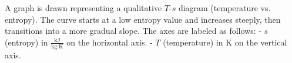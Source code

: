 A graph is drawn representing a qualitative \( T \)-\( s \) diagram (temperature vs. entropy). The curve starts at a low entropy value and increases steeply, then transitions into a more gradual slope. The axes are labeled as follows:  
- \( s \) (entropy) in \( \frac{\text{kJ}}{\text{kg·K}} \) on the horizontal axis.  
- \( T \) (temperature) in \( \text{K} \) on the vertical axis.